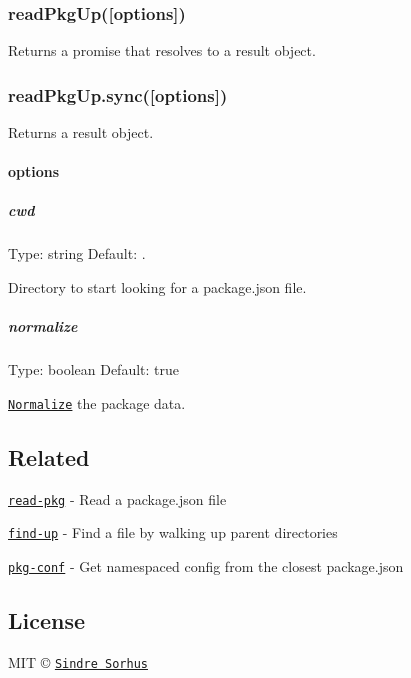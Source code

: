 \subsubsection*{read\+Pkg\+Up(\mbox{[}options\mbox{]})}

Returns a promise that resolves to a result object.

\subsubsection*{read\+Pkg\+Up.\+sync(\mbox{[}options\mbox{]})}

Returns a result object.

\paragraph*{options}

\subparagraph*{cwd}

Type\+: {\ttfamily string} Default\+: {\ttfamily .}

Directory to start looking for a package.\+json file.

\subparagraph*{normalize}

Type\+: {\ttfamily boolean} Default\+: {\ttfamily true}

\href{https://github.com/npm/normalize-package-data#what-normalization-currently-entails}{\tt Normalize} the package data.

\subsection*{Related}


\begin{DoxyItemize}
\item \href{https://github.com/sindresorhus/read-pkg}{\tt read-\/pkg} -\/ Read a package.\+json file
\item \href{https://github.com/sindresorhus/find-up}{\tt find-\/up} -\/ Find a file by walking up parent directories
\item \href{https://github.com/sindresorhus/pkg-conf}{\tt pkg-\/conf} -\/ Get namespaced config from the closest package.\+json
\end{DoxyItemize}

\subsection*{License}

M\+IT © \href{http://sindresorhus.com}{\tt Sindre Sorhus} 